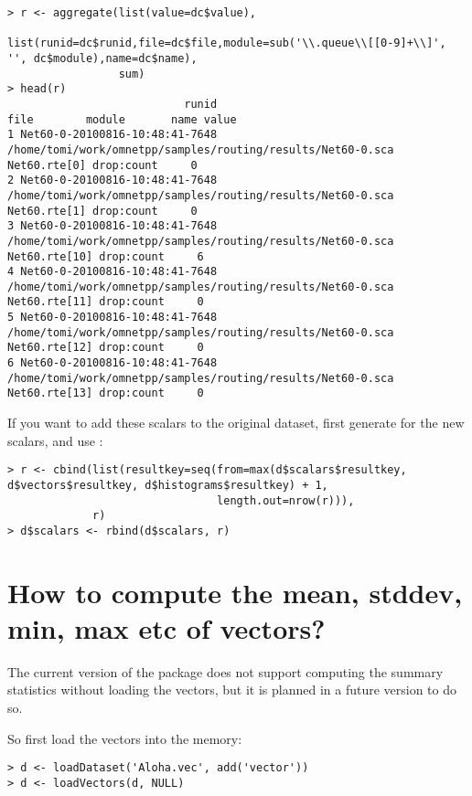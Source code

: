 \begin{verbatim}
> r <- aggregate(list(value=dc$value),
                 list(runid=dc$runid,file=dc$file,module=sub('\\.queue\\[[0-9]+\\]', '', dc$module),name=dc$name),
                 sum)
> head(r)
                           runid                                                        file        module       name value
1 Net60-0-20100816-10:48:41-7648 /home/tomi/work/omnetpp/samples/routing/results/Net60-0.sca  Net60.rte[0] drop:count     0
2 Net60-0-20100816-10:48:41-7648 /home/tomi/work/omnetpp/samples/routing/results/Net60-0.sca  Net60.rte[1] drop:count     0
3 Net60-0-20100816-10:48:41-7648 /home/tomi/work/omnetpp/samples/routing/results/Net60-0.sca Net60.rte[10] drop:count     6
4 Net60-0-20100816-10:48:41-7648 /home/tomi/work/omnetpp/samples/routing/results/Net60-0.sca Net60.rte[11] drop:count     0
5 Net60-0-20100816-10:48:41-7648 /home/tomi/work/omnetpp/samples/routing/results/Net60-0.sca Net60.rte[12] drop:count     0
6 Net60-0-20100816-10:48:41-7648 /home/tomi/work/omnetpp/samples/routing/results/Net60-0.sca Net60.rte[13] drop:count     0
\end{verbatim}

If you want to add these scalars to the original dataset, first generate  for the new scalars,
and use :

\begin{verbatim}
> r <- cbind(list(resultkey=seq(from=max(d$scalars$resultkey, d$vectors$resultkey, d$histograms$resultkey) + 1,
                                length.out=nrow(r))),
             r)
> d$scalars <- rbind(d$scalars, r)
\end{verbatim}

\section{How to compute the mean, stddev, min, max etc of vectors?}

The current version of the  package does not support computing
the summary statistics without loading the vectors, but it is planned in a future
version to do so.

So first load the vectors into the memory:

\begin{verbatim}
> d <- loadDataset('Aloha.vec', add('vector'))
> d <- loadVectors(d, NULL)
\end{verbatim}

